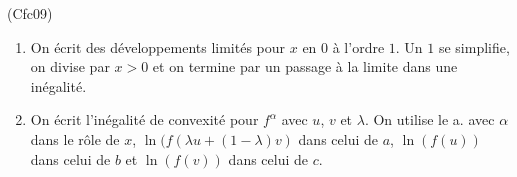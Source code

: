 \begin{tiny}(Cfc09)\end{tiny}
\begin{enumerate}
 \item On écrit des développements limités pour $x$ en $0$ à l'ordre $1$. Un $1$ se simplifie, on divise par $x>0$ et on termine par un passage à la limite dans une inégalité.
 \item On écrit l'inégalité de convexité pour $f^\alpha$ avec $u$, $v$ et $\lambda$. On utilise le a. avec
$\alpha$ dans le rôle de $x$, $\ln(f(\lambda u+(1-\lambda)v)$ dans celui de $a$, $\ln(f(u))$ dans celui de $b$ et $\ln(f(v))$ dans celui de $c$.
\end{enumerate}
